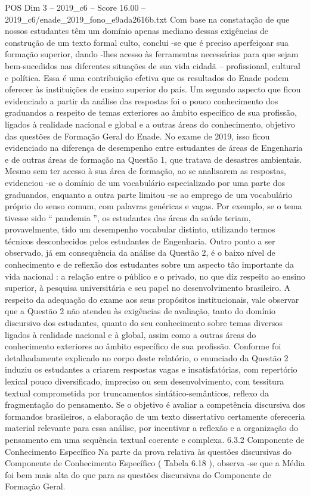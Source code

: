 \begin{textsample}{POS Dim 3 – 2019\_c6 – Score 16.00 – 2019\_c6/enade\_2019\_fono\_e9ada2616b.txt}
Com base na constatação de que nossos estudantes têm um domínio apenas mediano dessas exigências de construção de um texto formal culto, conclui -se que é preciso aperfeiçoar sua formação superior, dando -lhes acesso às ferramentas necessárias para que sejam bem-sucedidos nas diferentes situações de sua vida cidadã – profissional, cultural e política.
Essa é uma contribuição efetiva que os resultados do Enade podem oferecer às instituições de ensino superior do país.
Um segundo aspecto que ficou evidenciado a partir da análise das respostas foi o pouco conhecimento dos graduandos a respeito de temas exteriores ao âmbito específico de sua profissão, ligados à realidade nacional e global e a outras áreas do conhecimento, objetivo das questões de Formação Geral do Enade.
No exame de 2019, isso ficou evidenciado na diferença de desempenho entre estudantes de áreas de Engenharia e de outras áreas de formação na Questão 1, que tratava de desastres ambientais.
Mesmo sem ter acesso à sua área de formação, ao se analisarem as respostas, evidenciou -se o domínio de um vocabulário especializado por uma parte dos graduandos, enquanto a outra parte limitou -se ao emprego de um vocabulário próprio do senso comum, com palavras genéricas e vagas.
Por exemplo, se o tema tivesse sido “ pandemia ”, os estudantes das áreas da saúde teriam, provavelmente, tido um desempenho vocabular distinto, utilizando termos técnicos desconhecidos pelos estudantes de Engenharia.
Outro ponto a ser observado, já em consequência da análise da Questão 2, é o baixo nível de conhecimento e de reflexão dos estudantes sobre um aspecto tão importante da vida nacional : a relação entre o público e o privado, no que diz respeito ao ensino superior, à pesquisa universitária e seu papel no desenvolvimento brasileiro.
A respeito da adequação do exame aos seus propósitos institucionais, vale observar que a Questão 2 não atendeu às exigências de avaliação, tanto do domínio discursivo dos estudantes, quanto do seu conhecimento sobre temas diversos ligados à realidade nacional e à global, assim como a outras áreas do conhecimento exteriores ao âmbito específico de sua profissão.
Conforme foi detalhadamente explicado no corpo deste relatório, o enunciado da Questão 2 induziu os estudantes a criarem respostas vagas e insatisfatórias, com repertório lexical pouco diversificado, impreciso ou sem desenvolvimento, com tessitura textual comprometida por truncamentos sintático-semânticos, reflexo da fragmentação do pensamento.
Se o objetivo é avaliar a competência discursiva dos formandos brasileiros, a elaboração de um texto dissertativo certamente ofereceria material relevante para essa análise, por incentivar a reflexão e a organização do pensamento em uma sequência textual coerente e complexa. 6.3.2 Componente de Conhecimento Específico Na parte da prova relativa às questões discursivas do Componente de Conhecimento Específico ( Tabela 6.18 ), observa -se que a Média foi bem mais alta do que para as questões discursivas do Componente de Formação Geral.

\end{textsample}
